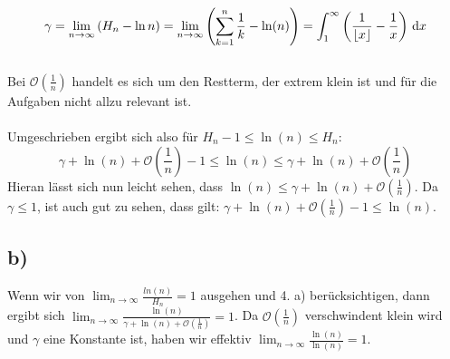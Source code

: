 \documentclass[a4paper]{scrartcl}
\begin{document}
\[ \gamma = \lim_{n\to\infty} \left(H_n - \ln n\right) = \lim_{n \rightarrow \infty } \left(\sum_{k=1}^n \frac{1}{k} - \ln(n) \right)=\int_1^\infty\left({1\over\lfloor x\rfloor}-{1\over x}\right)\,\mathrm dx \] \\
%
Bei \(\mathcal O\!\left(\frac 1{n}\right)\) handelt es sich um den Restterm, der extrem klein ist und für die Aufgaben nicht allzu relevant ist. \\ \\
%
Umgeschrieben ergibt sich also für \(H_n -1 \leq \ln (n) \leq H_n \):
\[ \gamma + \ln (n) +\mathcal O\!\left(\frac 1{n}\right) -1 \leq \ln (n) \leq \gamma + \ln (n) +\mathcal O\!\left(\frac 1{n}\right)\]
%
Hieran lässt sich nun leicht sehen, dass \( \ln (n) \leq \gamma + \ln (n) +\mathcal O\!\left(\frac 1{n}\right) \). Da \(\gamma \leq 1\), ist auch gut zu sehen, dass gilt: \( \gamma + \ln (n) +\mathcal O\!\left(\frac 1{n}\right) -1 \leq \ln (n) \).

\subsection{b)}
Wenn wir von \(\lim_{n\to\infty} \frac {ln(n)} {H_n} = 1 \) ausgehen und 4. a) berücksichtigen, dann ergibt sich \(\lim_{n\to\infty} \frac {\ln(n)} {\gamma + \ln (n) +\mathcal O\!\left(\frac 1{n}\right) } = 1 \). Da \(\mathcal O\!\left(\frac 1{n}\right)\) verschwindent klein wird und \(\gamma\) eine Konstante ist, haben wir effektiv \(\lim_{n\to\infty} \frac {\ln(n)} {\ln(n)} = 1\).
\end{document}
